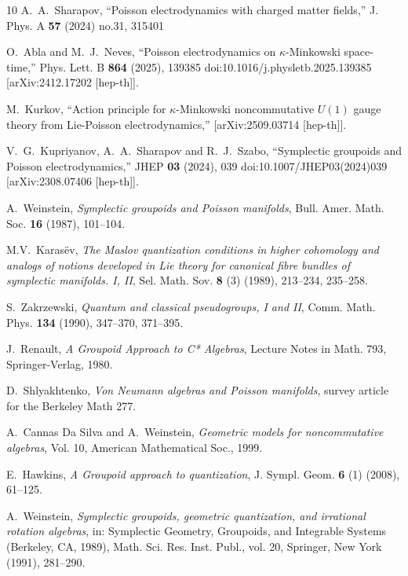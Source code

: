 \documentclass[12pt,a4paper]{article}
\numberwithin{equation}{section}
\theoremstyle{definition}
\begin{document}
{\begin{thebibliography}{10}
A.~A.~Sharapov,
``Poisson electrodynamics with charged matter fields,''
J. Phys. A \textbf{57} (2024) no.31, 315401

O.~Abla and M.~J.~Neves,
``Poisson electrodynamics on {\ensuremath{\kappa}}-Minkowski space-time,''
Phys. Lett. B \textbf{864} (2025), 139385
doi:10.1016/j.physletb.2025.139385
[arXiv:2412.17202 [hep-th]].

M.~Kurkov,
``Action principle for $\kappa$-Minkowski noncommutative $U(1)$ gauge theory from Lie-Poisson electrodynamics,''
[arXiv:2509.03714 [hep-th]].

V.~G.~Kupriyanov, A.~A.~Sharapov and R.~J.~Szabo,
``Symplectic groupoids and Poisson electrodynamics,''
JHEP \textbf{03} (2024), 039
doi:10.1007/JHEP03(2024)039
[arXiv:2308.07406 [hep-th]].

A.~Weinstein, \emph{Symplectic groupoids and Poisson manifolds}, Bull. Amer. Math. Soc. \textbf{16} (1987), 101--104.

M.V.~Karasëv, \emph{The Maslov quantization conditions in higher cohomology and analogs of notions developed in Lie theory for canonical fibre bundles of symplectic manifolds. I, II}, Sel. Math. Sov. \textbf{8} (3) (1989), 213--234, 235--258.

S.~Zakrzewski, \emph{Quantum and classical pseudogroups, I and II}, Comm. Math. Phys. \textbf{134} (1990), 347--370, 371--395.

J.~Renault, \emph{A Groupoid Approach to C* Algebras}, Lecture Notes in Math. 793, Springer-Verlag, 1980.

D.~Shlyakhtenko, \emph{Von Neumann algebras and Poisson manifolds}, survey article for the Berkeley Math 277.

A.~Cannas Da Silva and A.~Weinstein, \emph{Geometric models for noncommutative algebras}, Vol. 10, American Mathematical Soc., 1999.

E.~Hawkins, \emph{A Groupoid approach to quantization}, J. Sympl. Geom. \textbf{6} (1) (2008), 61--125.

A.~Weinstein, \emph{Symplectic groupoids, geometric quantization, and irrational rotation algebras}, in: Symplectic Geometry, Groupoids, and Integrable Systems (Berkeley, CA, 1989), Math. Sci. Res. Inst. Publ., vol. 20, Springer, New York (1991), 281--290.


\end{thebibliography}}
\end{document}
